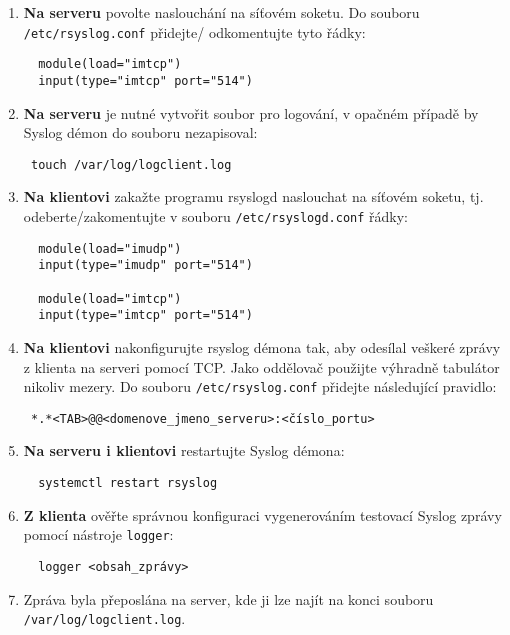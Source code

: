 \begin{itemize}
\begin{enumerate}
            \item {\bf Na serveru} povolte naslouchání na síťovém soketu. Do souboru {\tt /etc/rsyslog.conf} přidejte/
            odkomentujte tyto řádky:

\begin{verbatim}
  module(load="imtcp")
  input(type="imtcp" port="514")
\end{verbatim}


            \item {\bf Na serveru} je nutné vytvořit soubor pro logování, v opačném případě by
         Syslog démon do souboru nezapisoval:
\begin{verbatim}
 touch /var/log/logclient.log
\end{verbatim} 

            \item {\bf Na klientovi} zakažte programu rsyslogd naslouchat na síťovém soketu, tj. odeberte/zakomentujte v souboru {\tt /etc/rsyslogd.conf} řádky:
\begin{verbatim}
  module(load="imudp")
  input(type="imudp" port="514")

  module(load="imtcp")
  input(type="imtcp" port="514")
\end{verbatim} 

            \item {\bf Na klientovi} nakonfigurujte rsyslog démona tak, aby odesílal veškeré zprávy
         z klienta na serveri pomocí TCP. Jako oddělovač použijte výhradně
         tabulátor nikoliv mezery. Do souboru {\tt /etc/rsyslog.conf} přidejte následující pravidlo:
\begin{verbatim} 
 *.*<TAB>@@<domenove_jmeno_serveru>:<číslo_portu>
\end{verbatim}

            \item {\bf Na serveru i klientovi} restartujte Syslog démona: 
\begin{verbatim}
  systemctl restart rsyslog
\end{verbatim} 

            \item {\bf Z klienta} ověřte správnou konfiguraci vygenerováním testovací Syslog 
         zprávy pomocí nástroje {\tt logger}:
\begin{verbatim} 
  logger <obsah_zprávy>
\end{verbatim} 
        
            \item Zpráva byla přeposlána na server, kde ji lze najít na konci souboru
         {\tt /var/log/logclient.log}.


\end{enumerate}
\end{itemize}
